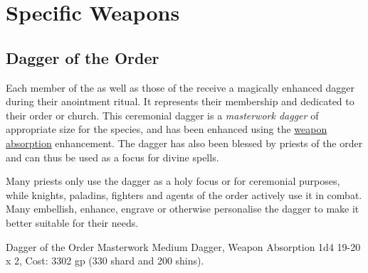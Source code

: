\section{Specific Weapons}
\label{sec:Specific Weapons}

\subsection{Dagger of the Order}
\label{sec:Dagger of the Order}

Each member of the  as well as those of the
 receive a magically enhanced dagger
during their anointment ritual. It represents their membership and dedicated
to their order or church. This ceremonial dagger is a \emph{masterwork dagger}
of appropriate size for the species, and has been enhanced using the
\hyperref[sec:Weapon Absorption]{weapon absorption} enhancement. The dagger
has also been blessed by priests of the order and can thus be used as a focus
for divine spells.

Many priests only use the dagger as a holy focus or for ceremonial purposes,
while knights, paladins, fighters and agents of the order actively use it
in combat. Many embellish, enhance, engrave or otherwise personalise the
dagger to make it better suitable for their needs.

\begin{35e}{Dagger of the Order}
  Masterwork Medium Dagger, Weapon Absorption 1d4 19-20 x 2, Cost: 3302
  gp (330 shard and 200 shins).
\end{35e}
